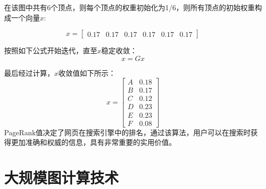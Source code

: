 在该图中共有6个顶点，则每个顶点的权重初始化为1/6，则所有顶点的初始权重构成一个向量$x$:

\[x = \left[ {\begin{array}{*{20}{c}}
{0.17}&{0.17}&{0.17}&{0.17}&{0.17}&{0.17}
\end{array}} \right]\]

按照如下公式开始迭代，直至$x$稳定收敛：
\[x = Gx\]

最后经过计算，$x$收敛值如下所示：
\[x = \left[ {\begin{array}{*{20}{c}}
A&{0.18}\\
B&{0.17}\\
C&{0.12}\\
D&{0.23}\\
E&{0.23}\\
F&{0.08}
\end{array}} \right]\]
PageRank值决定了网页在搜索引擎中的排名，通过该算法，用户可以在搜索时获得更加准确和权威的信息，具有非常重要的实用价值。

\section{大规模图计算技术}

